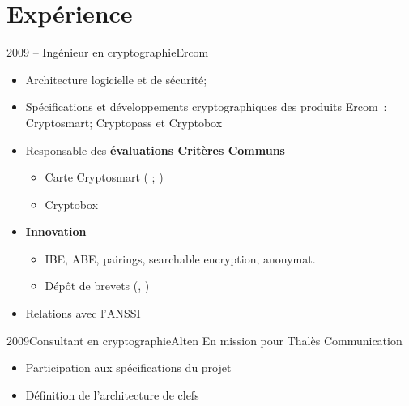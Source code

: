 \documentclass[french, a4paper]{customcv}
\begin{document}
\makeprofile
\section{Expérience}

\begin{cventry}{2009 -- }{Ingénieur en cryptographie}{\href{https://www.ercom.fr/}{Ercom}}
  \begin{itemize}
    \item  Architecture logicielle et de sécurité;
    \item Spécifications et développements cryptographiques des produits Ercom~:\linebreak
          Cryptosmart; Cryptopass et Cryptobox
    \item Responsable des \textbf{évaluations Critères Communs}
          \begin{itemize}
            \item Carte Cryptosmart (\cite{anssi.2012/71} ; \cite{anssi.2016/69})
            \item Cryptobox \cite{anssi.2018/23}
          \end{itemize}
    \item \textbf{Innovation}
          \begin{itemize}
            \item IBE, ABE, pairings, searchable encryption, anonymat.
            \item Dépôt de brevets (\cite{pat.save}, \cite{pat.card.auth})
          \end{itemize}
    \item Relations avec l'ANSSI
  \end{itemize}
\end{cventry}

\begin{cventry}{2009}{Consultant en cryptographie}{Alten}
  En mission pour Thalès Communication
  \begin{itemize}
    \item Participation aux spécifications du projet
    \item Définition de l'architecture de clefs
  \end{itemize}
\end{cventry}
\end{document}
